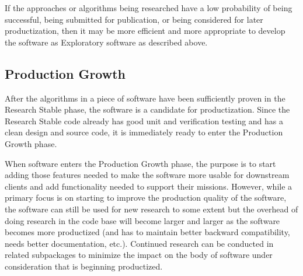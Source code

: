 \documentclass[11pt]{SANDreport}
\begin{document}
If the approaches or algorithms being researched have a low probability of being successful, being submitted for publication, or being considered for later productization, then it may be more efficient and more appropriate to develop the software as Exploratory software as described above.


%
{}\subsection{Production Growth}
%

After the algorithms in a piece of software have been sufficiently proven in the Research Stable phase, the software is a candidate for productization.  Since the Research Stable code already has good unit and verification testing and has a clean design and source code, it is immediately ready to enter the Production Growth phase.

\begin{figure}
\begin{center}
\end{center}
\end{figure}

When software enters the Production Growth phase, the purpose is to start adding those features needed to make the software more usable for downstream clients and add functionality needed to support their missions.  However, while a primary focus is on starting to improve the production quality of the software, the software can still be used for new research to some extent but the overhead of doing research in the code base will become larger and larger as the software becomes more productized (and has to maintain better backward compatibility, needs better documentation, etc.).  Continued research can be conducted in related subpackages to minimize the impact on the body of software under consideration that is beginning productized.
\end{document}
